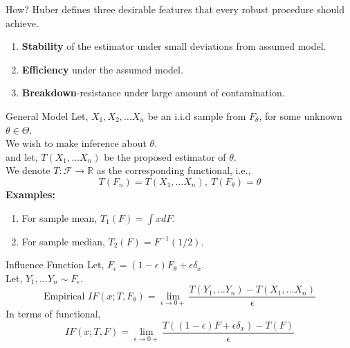 \documentclass[10pt,xcolor=svgnames]{beamer} %
\newcommand{\R}{\mathbb{R}}
\begin{document}

\begin{frame}{How?}
    Huber defines three desirable features that every robust procedure should achieve. 
    \begin{enumerate}
        \item \textbf{Stability} of the estimator under small deviations from assumed model.
        \pause
        \item \textbf{Efficiency} under the assumed model.
        \pause
        \item \textbf{Breakdown}-resistance under large amount of contamination.
    \end{enumerate}
\end{frame}

\begin{frame}{General Model}
    Let, $X_1, X_2, \dots X_n$ be an i.i.d sample from $F_{\theta}$, for some unknown $\theta \in \Theta$.\\
    We wish to make inference about $\theta$.\\
    and let, $T(X_1, \dots X_n)$ be the proposed estimator of $\theta$.\\
    We denote $T : \mathcal{F} \rightarrow \R$ as the corresponding functional, i.e.,
    \begin{equation*}
        T(F_n) = T(X_1, \dots X_n), \ T(F_{\theta}) = \theta
    \end{equation*}
    \pause
    \textbf{Examples:}
    \begin{enumerate}
        \item For sample mean, $T_1(F) = \int x dF$.
        \item For sample median, $T_2(F) = F^{-1}(1/2)$.
    \end{enumerate}
\end{frame}

\begin{frame}{Influence Function}
    Let, $F_{\epsilon} = (1-\epsilon)F_{\theta} + \epsilon \delta_x$.\\
    Let, $Y_1, \dots Y_n \sim F_{\epsilon}$.\\
    \begin{equation*}
        \text{Empirical } IF(x; T, F_{\theta}) = \lim_{\epsilon \rightarrow 0+}\dfrac{T(Y_1, \dots Y_n) - T(X_1, \dots X_n)}{\epsilon}
    \end{equation*}
    In terms of functional,
    \begin{equation*}
        IF(x; T, F) = \lim_{\epsilon \rightarrow 0+} \dfrac{T((1-\epsilon)F + \epsilon \delta_x ) - T(F)}{\epsilon}
    \end{equation*}
\end{frame}
\end{document}
